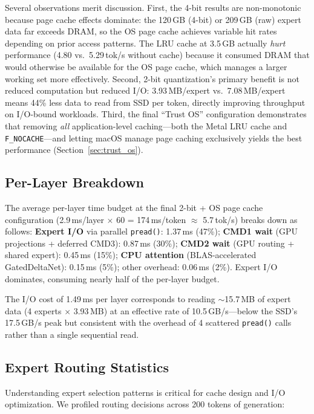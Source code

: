 \documentclass[11pt,twocolumn]{article}
\begin{document}
Several observations merit discussion.
First, the 4-bit results are non-monotonic because page cache effects dominate: the 120\,GB (4-bit) or 209\,GB (raw) expert data far exceeds DRAM, so the OS page cache achieves variable hit rates depending on prior access patterns.
The LRU cache at 3.5\,GB actually \emph{hurt} performance (4.80 vs.\ 5.29\,tok/s without cache) because it consumed DRAM that would otherwise be available for the OS page cache, which manages a larger working set more effectively.
Second, 2-bit quantization's primary benefit is not reduced computation but reduced I/O: 3.93\,MB/expert vs.\ 7.08\,MB/expert means 44\% less data to read from SSD per token, directly improving throughput on I/O-bound workloads.
Third, the final ``Trust OS'' configuration demonstrates that removing \emph{all} application-level caching---both the Metal LRU cache and \texttt{F\_NOCACHE}---and letting macOS manage page caching exclusively yields the best performance (Section~\ref{sec:trust_os}).

\subsection{Per-Layer Breakdown}

The average per-layer time budget at the final 2-bit + OS page cache configuration (2.9\,ms/layer $\times$ 60 = 174\,ms/token $\approx$ 5.7\,tok/s) breaks down as follows: \textbf{Expert I/O} via parallel \texttt{pread()}: 1.37\,ms (47\%); \textbf{CMD1 wait} (GPU projections + deferred CMD3): 0.87\,ms (30\%); \textbf{CMD2 wait} (GPU routing + shared expert): 0.45\,ms (15\%); \textbf{CPU attention} (BLAS-accelerated GatedDeltaNet): 0.15\,ms (5\%); other overhead: 0.06\,ms (2\%).
Expert I/O dominates, consuming nearly half of the per-layer budget.

The I/O cost of 1.49\,ms per layer corresponds to reading $\sim$15.7\,MB of expert data (4 experts $\times$ 3.93\,MB) at an effective rate of 10.5\,GB/s---below the SSD's 17.5\,GB/s peak but consistent with the overhead of 4 scattered \texttt{pread()} calls rather than a single sequential read.

\subsection{Expert Routing Statistics}

Understanding expert selection patterns is critical for cache design and I/O optimization.
We profiled routing decisions across 200 tokens of generation:
\end{document}
